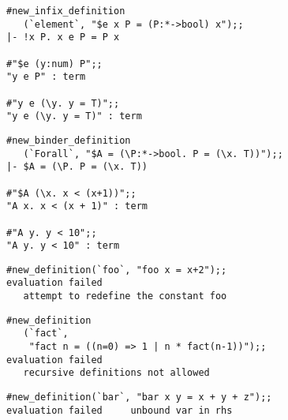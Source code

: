 \vskip4mm
\begin{session}\begin{verbatim}
#new_infix_definition
   (`element`, "$e x P = (P:*->bool) x");;
|- !x P. x e P = P x

#"$e (y:num) P";;
"y e P" : term

#"y e (\y. y = T)";;
"y e (\y. y = T)" : term
\end{verbatim}\end{session}

\vskip4mm
\begin{session}\begin{verbatim}
#new_binder_definition
   (`Forall`, "$A = (\P:*->bool. P = (\x. T))");;
|- $A = (\P. P = (\x. T))

#"$A (\x. x < (x+1))";;
"A x. x < (x + 1)" : term

#"A y. y < 10";;
"A y. y < 10" : term
\end{verbatim}\end{session}



\vskip4mm
\begin{session}\begin{verbatim}
#new_definition(`foo`, "foo x = x+2");;
evaluation failed
   attempt to redefine the constant foo
\end{verbatim}\end{session}

\vskip4mm
\begin{session}\begin{verbatim}
#new_definition
   (`fact`, 
    "fact n = ((n=0) => 1 | n * fact(n-1))");;
evaluation failed  
   recursive definitions not allowed
\end{verbatim}\end{session}

\vskip4mm
\begin{session}\begin{verbatim}
#new_definition(`bar`, "bar x y = x + y + z");;
evaluation failed     unbound var in rhs
\end{verbatim}\end{session}


